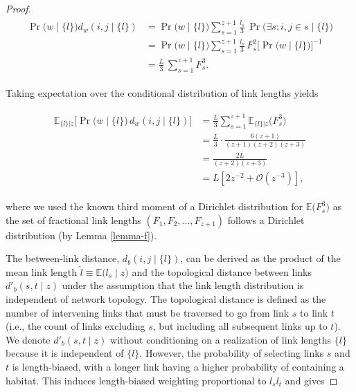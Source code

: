 \documentclass[11pt, class=article, crop=false]{standalone}
\theoremstyle{definition}
\begin{document}
\begin{proof}
\begin{align}
    \begin{split}
    \Pr \bigl(w \mid \{l\}\bigr) d_w(i,j \mid \{l\})
    &= 
    \Pr \bigl(w \mid \{l\} \bigr) \sum_{s=1}^{z+1} \frac{l_s}{3}\,
    \Pr\bigl(\exists s: i, j\in s\mid\{l\} \bigr) \\
    &=
    \Pr \bigl(w \mid \{l\} \bigr) \sum_{s=1}^{z+1} \frac{l_s}{3}\, F_s^2 
    \bigl[\Pr \bigl(w \mid \{l\} \bigr) \bigr]^{-1} \\
    &= 
    \frac{L}{3}\,
    \sum_{s=1}^{z+1} F_s^3.
    \end{split}
\end{align}

Taking expectation over the conditional distribution of link lengths yields

\begin{align}
    \begin{split}
    \mathbb{E}_{\{l\}|z} \bigl[\Pr \bigl(w \mid \{l\} \bigr)\, d_w(i,j \mid \{l\})\bigr]
    &= 
    \frac{L}{3} \sum_{s = 1}^{z+1}\mathbb{E}_{\{l\}|z} \bigl(F_s^3\bigr)\\
    &=\frac{L}{3} \cdot \frac{6(z+1)}{(z+1)(z+2)(z+3)}\\
    &= \frac{2L}{(z+2)(z+3)}\\
    &= L \left[ 2z^{-2} + \mathcal{O}(z^{-3}) \right],
    \end{split}
\end{align}

where we used the known third moment of a Dirichlet distribution for $\mathbb{E}\bigl(F_s^3\bigr)$ \citep{kotz2000continuous} as the set of fractional link lengths $(F_1, F_2,...,F_{z+1})$ follows a Dirichlet distribution (by Lemma \ref{lemma-f}).

The between-link distance, $d_b(i,j \mid \{l\})$, can be derived as the product of the mean link length $\hat{l} \equiv \mathbb{E}\bigl(l_s \mid z \bigr)$ and the topological distance between links $d'_b(s,t \mid z)$ under the assumption that the link length distribution is independent of network topology.
The topological distance is defined as the number of intervening links that must be traversed to go from link $s$ to link $t$ (i.e., the count of links excluding $s$, but including all subsequent links up to $t$).
We denote $d'_b(s,t \mid z)$ without conditioning on a realization of link lengths $\{l\}$ because it is independent of $\{l\}$.
However, the probability of selecting links $s$ and $t$ is length-biased, with a longer link having a higher probability of containing a habitat.
This induces length-biased weighting proportional to $l_s l_t$ and gives


\end{proof}
\end{document}
